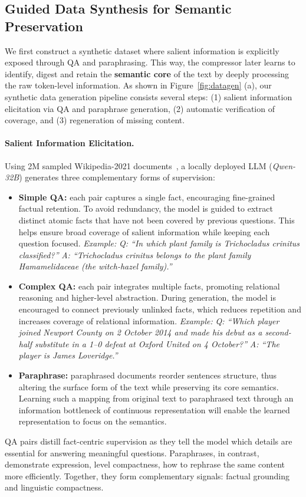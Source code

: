 \documentclass{applemlr}
\numberwithin{equation}{section}
\begin{document}
\subsection{Guided Data Synthesis for Semantic Preservation}

We first construct a synthetic dataset where salient information is explicitly exposed through QA and paraphrasing. This way, the compressor later learns to identify, digest and retain the \textbf{semantic core} of the text by deeply processing the raw token-level information. 
As shown in Figure~\ref{fig:datagen} (a), our synthetic data generation pipeline consists several steps:  
(1) salient information elicitation via QA and paraphrase generation,  
(2) automatic verification of coverage, and  
(3) regeneration of missing content.

\paragraph{Salient Information Elicitation.}
Using 2M sampled Wikipedia-2021 documents~\citep{10.5555/3648699.3648950}, a locally deployed LLM (\textit{Qwen-32B}) generates three complementary forms of supervision:
\begin{itemize}
\setlength{\itemsep}{0pt}
\item \textbf{Simple QA:} each pair captures a single fact, encouraging fine-grained factual retention. 
To avoid redundancy, the model is guided to extract distinct atomic facts that have not been covered by previous questions. This helps ensure broad coverage of salient information while keeping each question focused. 
\textit{Example:} \textit{Q: ``In which plant family is \emph{Trichocladus crinitus} classified?''}  
\textit{A: ``\emph{Trichocladus crinitus} belongs to the plant family Hamamelidaceae (the witch-hazel family).''}

\item \textbf{Complex QA:} each pair integrates multiple facts, promoting relational reasoning and higher-level abstraction. 
During generation, the model is encouraged to connect previously unlinked facts, which reduces repetition and increases coverage of relational information. 
\textit{Example:} \textit{Q: ``Which player joined Newport County on 2 October 2014 and made his debut as a second-half substitute in a 1–0 defeat at Oxford United on 4 October?''}  
\textit{A: ``The player is James Loveridge.''}

\item \textbf{Paraphrase:} paraphrased documents reorder sentences structure, thus altering the surface form of the text while preserving its core semantics. Learning such a mapping from original text to paraphrased text through an information bottleneck of continuous representation will enable the learned representation to focus on the semantics. 
\end{itemize}
QA pairs distill fact-centric supervision as they tell the model which details are essential for answering meaningful questions.
Paraphrases, in contrast, demonstrate expression, level compactness, how to rephrase the same content more efficiently.
Together, they form complementary signals: factual grounding and linguistic compactness.
\end{document}
